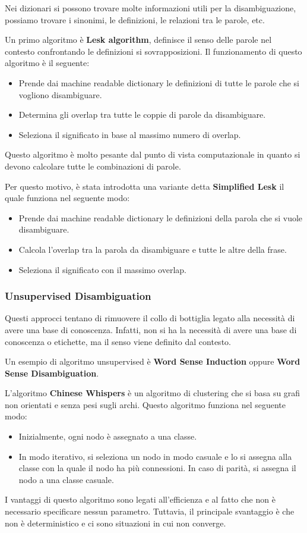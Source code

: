Nei dizionari si possono trovare molte informazioni utili per la disambiguazione,
possiamo trovare i sinonimi, le definizioni, le relazioni tra le parole, etc.

Un primo algoritmo è \textbf{Lesk algorithm}, definisce il senso delle parole
nel contesto confrontando le definizioni si sovrapposizioni. Il funzionamento di
questo algoritmo è il seguente:
\begin{itemize}
      \item Prende dai machine readable dictionary le definizioni di tutte le
            parole che si vogliono disambiguare.
      \item Determina gli overlap tra tutte le coppie di parole da disambiguare.
      \item Seleziona il significato in base al massimo numero di overlap.
\end{itemize}
Questo algoritmo è molto pesante dal punto di vista computazionale in quanto
si devono calcolare tutte le combinazioni di parole.

Per questo motivo, è stata introdotta una variante detta \textbf{Simplified Lesk}
il quale funziona nel seguente modo:
\begin{itemize}
      \item Prende dai machine readable dictionary le definizioni della parola
            che si vuole disambiguare.
      \item Calcola l'overlap tra la parola da disambiguare e tutte le altre
            della frase.
      \item Seleziona il significato con il massimo overlap.
\end{itemize}
\subsubsection{Unsupervised Disambiguation}
Questi approcci tentano di rimuovere il collo di bottiglia legato alla necessità
di avere una base di conoscenza. Infatti, non si ha la necessità di avere una
base di conoscenza o etichette, ma il senso viene definito dal contesto.

Un esempio di algoritmo unsupervised è \textbf{Word Sense Induction} oppure
\textbf{Word Sense Disambiguation}.

L'algoritmo \textbf{Chinese Whispers} è un algoritmo di clustering che si basa
su grafi non orientati e senza pesi sugli archi. Questo algoritmo funziona nel
seguente modo:
\begin{itemize}
      \item Inizialmente, ogni nodo è assegnato a una classe.
      \item In modo iterativo, si seleziona un nodo in modo casuale e lo si assegna
            alla classe con la quale il nodo ha più connessioni. In caso di
            parità, si assegna il nodo a una classe casuale.
\end{itemize}
I vantaggi di questo algoritmo sono legati all'efficienza e al fatto che non è
necessario specificare nessun parametro. Tuttavia, il principale svantaggio è
che non è deterministico e ci sono situazioni in cui non converge.

